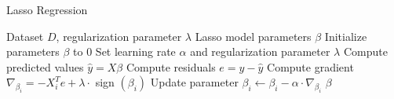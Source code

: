 \documentclass{article}
\begin{document}
	
	\begin{algorithm}
		\caption{Lasso Regression}
		\begin{algorithmic}[1]
			\Require Dataset $D$, regularization parameter $\lambda$
			\Ensure Lasso model parameters $\beta$
			\State Initialize parameters $\beta$ to 0
			\State Set learning rate $\alpha$ and regularization parameter $\lambda$
			\State Compute predicted values $\hat{y} = X\beta$
			\State Compute residuals $e = y - \hat{y}$
			\State Compute gradient $\nabla_{\beta_i} = -X_i^T e + \lambda \cdot $ sign $(\beta_i)$
			\State Update parameter $\beta_i \leftarrow \beta_i - \alpha \cdot \nabla_{\beta_i}$
			\EndFor
			\EndWhile
			\State \Return $\beta$
		\end{algorithmic}
	\end{algorithm}
	
\end{document}
